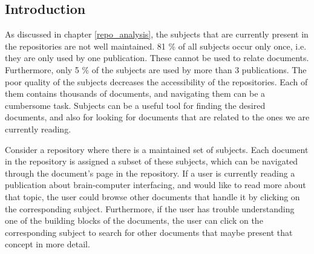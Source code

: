 \subsection{Introduction} \label{problem_intro}

As discussed in chapter \ref{repo_analysis}, the subjects that are currently present in the repositories are not well maintained. 81 \% of all subjects occur only once, i.e. they are only used by one publication. These cannot be used to relate documents. Furthermore, only 5 \% of the subjects are used by more than 3 publications. The poor quality of the subjects decreases the accessibility of the repositories. Each of them contains thousands of documents, and navigating them can be a cumbersome task. Subjects can be a useful tool for finding the desired documents, and also for looking for documents that are related to the ones we are currently reading.

Consider a repository where there is a maintained set of subjects. Each document in the repository is assigned a subset of these subjects, which can be navigated through the document's page in the repository. If a user is currently reading a publication about brain-computer interfacing, and would like to read more about that topic, the user could browse other documents that handle it by clicking on the corresponding subject. Furthermore, if the user has trouble understanding one of the building blocks of the documents, the user can click on the corresponding subject to search for other documents that maybe present that concept in more detail.